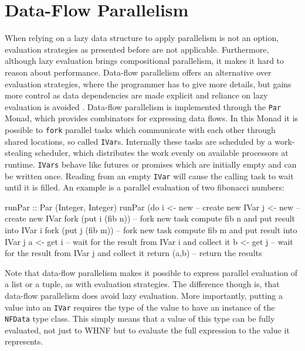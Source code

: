 \section{Data-Flow Parallelism}
When relying on a lazy data structure to apply parallelism is not an option, evaluation strategies as presented before are not applicable. Furthermore, although lazy evaluation brings compositional parallelism, it makes it hard to reason about performance. Data-flow parallelism offers an alternative over evaluation strategies, where the programmer has to give more details, but gains more control as data dependencies are made explicit and reliance on lazy evaluation is avoided \cite{marlow_monad_2011}.
Data-flow parallelism is implemented through the \texttt{Par} Monad, which provides combinators for expressing data flows. In this Monad it is possible to \texttt{fork} parallel tasks which communicate with each other through shared locations, so called \texttt{IVar}s. Internally these tasks are scheduled by a work-stealing scheduler, which distributes the work evenly on available processors at runtime. \texttt{IVars} behave like futures or promises which are initially empty and can be written once. Reading from an empty \texttt{IVar} will cause the calling task to wait until it is filled. An example is a parallel evaluation of two fibonacci numbers:

\begin{HaskellCode}
runPar :: Par (Integer, Integer)
runPar (do
  i <- new             -- create new IVar
  j <- new             -- create new IVar
  fork (put i (fib n)) -- fork new task compute fib n and put result into IVar i
  fork (put j (fib m)) -- fork new task compute fib m and put result into IVar j
  a <- get i           -- wait for the result from IVar i and collect it
  b <- get j           -- wait for the result from IVar j and collect it
  return (a,b)         -- return the results
\end{HaskellCode}

Note that data-flow parallelism makes it possible to express parallel evaluation of a list or a tuple, as with evaluation strategies. The difference though is, that data-flow parallelism does avoid lazy evaluation. More importantly, putting a value into an \texttt{IVar} requires the type of the value to have an instance of the \texttt{NFData} type class. This simply means that a value of this type can be fully evaluated, not just to WHNF but to evaluate the full expression to the value it represents.

